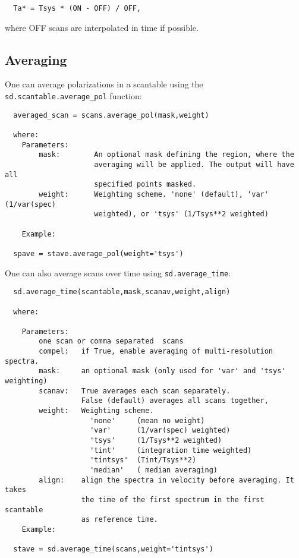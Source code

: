 \begin{verbatim}
  Ta* = Tsys * (ON - OFF) / OFF,
\end{verbatim}

where OFF scans are interpolated in time if possible.
\subsection{Averaging}
\label{subsubsection:sd.asap.averaging}

One can average polarizations in a scantable using the
{\tt sd.scantable.average\_pol} function:
\small
\begin{verbatim}
  averaged_scan = scans.average_pol(mask,weight)

  where:
    Parameters:
        mask:        An optional mask defining the region, where the
                     averaging will be applied. The output will have all
                     specified points masked.
        weight:      Weighting scheme. 'none' (default), 'var' (1/var(spec)
                     weighted), or 'tsys' (1/Tsys**2 weighted)

    Example:

  spave = stave.average_pol(weight='tsys')
\end{verbatim}
\normalsize

One can also average scans over time using {\tt sd.average\_time}:
\small
\begin{verbatim}
  sd.average_time(scantable,mask,scanav,weight,align)

  where:

    Parameters:
        one scan or comma separated  scans
        compel:   if True, enable averaging of multi-resolution spectra.
        mask:     an optional mask (only used for 'var' and 'tsys' weighting)
        scanav:   True averages each scan separately.
                  False (default) averages all scans together,
        weight:   Weighting scheme.
                    'none'     (mean no weight)
                    'var'      (1/var(spec) weighted)
                    'tsys'     (1/Tsys**2 weighted)
                    'tint'     (integration time weighted)
                    'tintsys'  (Tint/Tsys**2)
                    'median'   ( median averaging)
        align:    align the spectra in velocity before averaging. It takes
                  the time of the first spectrum in the first scantable
                  as reference time.
    Example:
  
  stave = sd.average_time(scans,weight='tintsys')
\end{verbatim}
\normalsize

